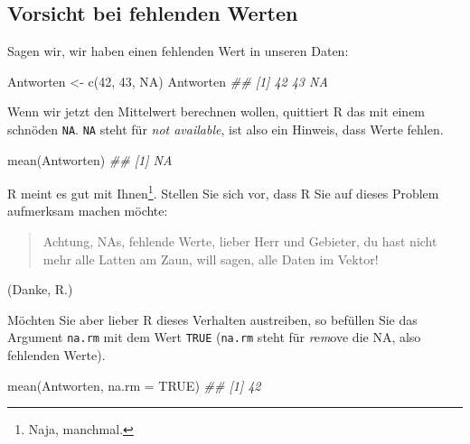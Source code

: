\documentclass[
  letterpaper,
  twoside,
  open=any]{scrbook}
\newenvironment{Shaded}{\begin{snugshade}}{\end{snugshade}}
\newcommand{\AttributeTok}[1]{\textcolor[rgb]{0.40,0.45,0.13}{#1}}
\newcommand{\ConstantTok}[1]{\textcolor[rgb]{0.56,0.35,0.01}{#1}}
\newcommand{\DecValTok}[1]{\textcolor[rgb]{0.68,0.00,0.00}{#1}}
\newcommand{\DocumentationTok}[1]{\textcolor[rgb]{0.37,0.37,0.37}{\textit{#1}}}
\newcommand{\FunctionTok}[1]{\textcolor[rgb]{0.28,0.35,0.67}{#1}}
\newcommand{\NormalTok}[1]{\textcolor[rgb]{0.00,0.23,0.31}{#1}}
\newcommand{\OtherTok}[1]{\textcolor[rgb]{0.00,0.23,0.31}{#1}}
\theoremstyle{definition}
\theoremstyle{definition}
\theoremstyle{definition}
\theoremstyle{remark}
\begin{document}
\subsection{Vorsicht bei fehlenden
Werten}\label{vorsicht-bei-fehlenden-werten}

Sagen wir, wir haben einen fehlenden Wert in unseren Daten:

\begin{Shaded}
\begin{Highlighting}[]
\NormalTok{Antworten }\OtherTok{\textless{}{-}} \FunctionTok{c}\NormalTok{(}\DecValTok{42}\NormalTok{, }\DecValTok{43}\NormalTok{, }\ConstantTok{NA}\NormalTok{)}
\NormalTok{Antworten}
\DocumentationTok{\#\# [1] 42 43 NA}
\end{Highlighting}
\end{Shaded}

Wenn wir jetzt den Mittelwert berechnen wollen, quittiert R das mit
einem schnöden \texttt{NA}. \texttt{NA} steht für \emph{not available},
ist also ein Hinweis, dass Werte fehlen.

\begin{Shaded}
\begin{Highlighting}[]
\FunctionTok{mean}\NormalTok{(Antworten)}
\DocumentationTok{\#\# [1] NA}
\end{Highlighting}
\end{Shaded}

R meint es gut mit Ihnen\footnote{{} Naja, manchmal.}.
Stellen Sie sich vor, dass R Sie auf dieses Problem aufmerksam machen
möchte:

\begin{quote}
{} Achtung, NAs, fehlende Werte, lieber Herr und Gebieter,
du hast nicht mehr alle Latten am Zaun, will sagen, alle Daten im
Vektor!
\end{quote}

(Danke, R.)

Möchten Sie aber lieber R dieses Verhalten austreiben, so befüllen Sie
das Argument \texttt{na.rm} mit dem Wert \texttt{TRUE} (\texttt{na.rm}
steht für \emph{r}e\emph{m}ove die NA, also fehlenden Werte).

\begin{Shaded}
\begin{Highlighting}[]
\FunctionTok{mean}\NormalTok{(Antworten, }\AttributeTok{na.rm =} \ConstantTok{TRUE}\NormalTok{)}
\DocumentationTok{\#\# [1] 42}
\end{Highlighting}
\end{Shaded}
\end{document}

